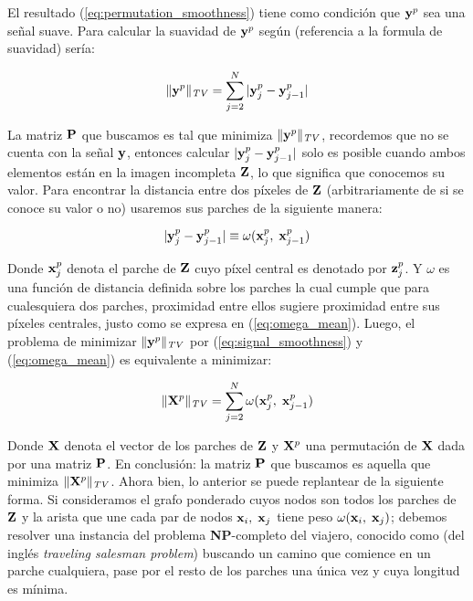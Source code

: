El resultado (\ref{eq:permutation_smoothness}) tiene como condici\'on que $\y^p$ sea una señal suave. Para calcular la suavidad de $\y^p$ según (referencia a la formula de suavidad) ser\'ia:

\begin{equation}
\|\y^p\|_{\mathit{TV}} = \sum_{j = 2}^{N}|\y_j^{p} - \y_{j - 1}^{p}|
\label{eq:signal_smoothness}
\end{equation}

La matriz $\P$ que buscamos es tal que minimiza $\|\y^p\|_{\mathit{TV}}$, recordemos que no se cuenta con la señal  $\y$, entonces calcular $|\y_j^{p} - \y_{j - 1}^{p}|$ solo es posible cuando ambos elementos est\'an en la imagen incompleta $\Z$, lo que significa que conocemos su valor. Para encontrar la distancia entre dos p\'ixeles de $\Z$ (arbitrariamente de si se conoce su valor o no) usaremos sus parches de la siguiente manera:

\begin{equation}
|\y_j^{p} - \y_{j - 1}^{p}| \equiv \omega(\x_j^p,\; \x_{j - 1}^p)
\label{eq:omega_mean}
\end{equation}

Donde $\x_j^p$ denota el parche de $\Z$ cuyo p\'ixel central es denotado por $\z_j^p$. Y $\omega$ es una funci\'on de distancia definida sobre los parches la cual cumple que para cualesquiera dos parches, proximidad entre ellos sugiere proximidad entre sus p\'ixeles centrales, justo como se expresa en (\ref{eq:omega_mean}). Luego, el problema de minimizar $\|\y^p\|_{\mathit{TV}}$ por (\ref{eq:signal_smoothness}) y (\ref{eq:omega_mean}) es equivalente a minimizar:

\begin{equation}
\|\X^p\|_{\mathit{TV}} = \sum_{j = 2}^{N}\omega(\x_j^{p},\; \x_{j - 1}^{p})
\label{eq:path_smoothness}
\end{equation}

Donde $\X$ denota el vector de los parches de $\Z$ y $\X^p$ una permutaci\'on de $\X$ dada por una matriz $\P$. En conclusi\'on: la matriz $\P$ que buscamos es aquella  que minimiza $\|\X^p\|_{\mathit{TV}}$. Ahora bien, lo anterior se puede replantear de la siguiente forma. Si consideramos el grafo ponderado cuyos nodos son todos los parches de $\Z$ y la arista que une cada par de nodos $\x_i,\;\x_j$ tiene peso $\omega(\x_i,\; \x_j)$; debemos resolver una instancia del problema \textbf{NP}-completo del viajero, conocido como \TSP (del ingl\'es \textit{traveling salesman problem}) buscando un camino que comience en un parche cualquiera, pase por el resto de los parches una \'unica vez y cuya longitud es m\'inima.

